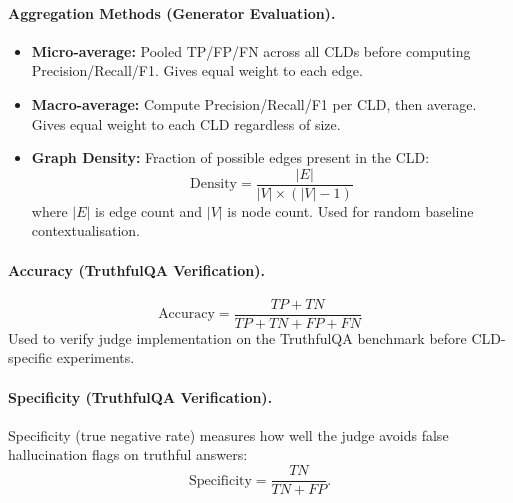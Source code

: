 \paragraph{Aggregation Methods (Generator Evaluation).}
\begin{itemize}[noitemsep]
    \item \textbf{Micro-average:} Pooled TP/FP/FN across all CLDs before computing Precision/Recall/F1. Gives equal weight to each edge.
    \item \textbf{Macro-average:} Compute Precision/Recall/F1 per CLD, then average. Gives equal weight to each CLD regardless of size.
    \item \textbf{Graph Density:} Fraction of possible edges present in the CLD:
    \begin{equation}
        \text{Density} = \frac{|E|}{|V| \times (|V| - 1)}
    \end{equation}
    where $|E|$ is edge count and $|V|$ is node count. Used for random baseline contextualisation.
\end{itemize}

\paragraph{Accuracy (TruthfulQA Verification).}
\begin{equation}
    \text{Accuracy} = \frac{TP + TN}{TP + TN + FP + FN}
\end{equation}
Used to verify judge implementation on the TruthfulQA benchmark before CLD-specific experiments.

\paragraph{Specificity (TruthfulQA Verification).}
Specificity (true negative rate) measures how well the judge avoids false hallucination flags on truthful answers:
\begin{equation}
    \text{Specificity} = \frac{TN}{TN + FP}.
\end{equation}

